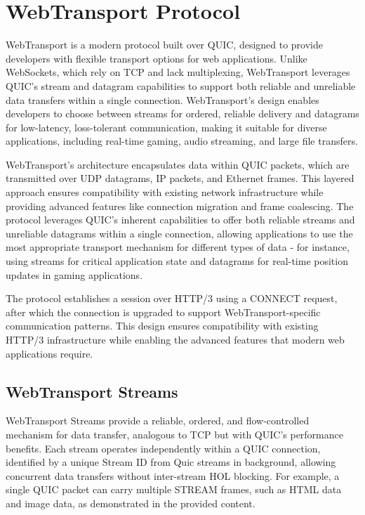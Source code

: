 \section{WebTransport Protocol}

WebTransport is a modern protocol built over QUIC, designed to provide developers with flexible transport options for web applications. Unlike WebSockets, which rely on TCP and lack multiplexing, WebTransport leverages QUIC’s stream and datagram capabilities to support both reliable and unreliable data transfers within a single connection. WebTransport’s design enables developers to choose between streams for ordered, reliable delivery and datagrams for low-latency, loss-tolerant communication, making it suitable for diverse applications, including real-time gaming, audio streaming, and large file transfers.

WebTransport's architecture encapsulates data within QUIC packets, which are transmitted over UDP datagrams, IP packets, and Ethernet frames. This layered approach ensures compatibility with existing network infrastructure while providing advanced features like connection migration and frame coalescing. The protocol leverages QUIC's inherent capabilities to offer both reliable streams and unreliable datagrams within a single connection, allowing applications to use the most appropriate transport mechanism for different types of data - for instance, using streams for critical application state and datagrams for real-time position updates in gaming applications.

The protocol establishes a session over HTTP/3 using a CONNECT request, after which the connection is upgraded to support WebTransport-specific communication patterns. This design ensures compatibility with existing HTTP/3 infrastructure while enabling the advanced features that modern web applications require.

\subsection{WebTransport Streams}

WebTransport Streams provide a reliable, ordered, and flow-controlled mechanism for data transfer, analogous to TCP but with QUIC’s performance benefits. Each stream operates independently within a QUIC connection, identified by a unique Stream ID from Quic streams in background, allowing concurrent data transfers without inter-stream HOL blocking. For example, a single QUIC packet can carry multiple STREAM frames, such as HTML data and image data, as demonstrated in the provided content.

